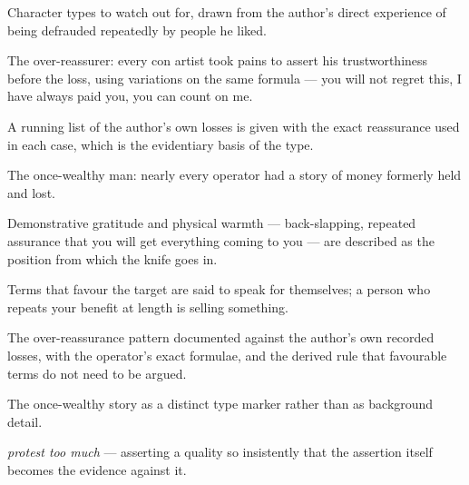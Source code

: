 

\begin{distilled}
  \item Character types to watch out for, drawn from the author's direct experience of being defrauded repeatedly by people he liked.
  \item The over-reassurer: every con artist took pains to assert his trustworthiness before the loss, using variations on the same formula --- you will not regret this, I have always paid you, you can count on me.
  \item A running list of the author's own losses is given with the exact reassurance used in each case, which is the evidentiary basis of the type.
  \item The once-wealthy man: nearly every operator had a story of money formerly held and lost.
  \item Demonstrative gratitude and physical warmth --- back-slapping, repeated assurance that you will get everything coming to you --- are described as the position from which the knife goes in.
  \item Terms that favour the target are said to speak for themselves; a person who repeats your benefit at length is selling something.
\end{distilled}

\begin{unique}
  \item The over-reassurance pattern documented against the author's own recorded losses, with the operator's exact formulae, and the derived rule that favourable terms do not need to be argued.
  \item The once-wealthy story as a distinct type marker rather than as background detail.
\end{unique}

\begin{terms}
  \item \emph{protest too much} --- asserting a quality so insistently that the assertion itself becomes the evidence against it.
\end{terms}
